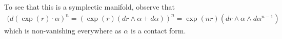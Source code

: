 
 
    To see that this is a symplectic manifold, observe that 
    \begin{align*}
        (d(\exp(r)\cdot \alpha)^n=( \exp(r) (dr\wedge\alpha + d\alpha))^n = \exp(nr) ( dr\wedge \alpha\wedge d\alpha^{n-1})
    \end{align*}
    which is non-vanishing everywhere as $\alpha$ is a contact form.
 